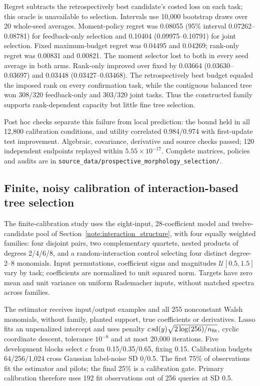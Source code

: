Regret subtracts the retrospectively best candidate's costed loss on each task; this oracle is unavailable to selection. Intervals use 10,000 bootstrap draws over 20 whole-seed averages.
Moment-policy regret was 0.08055 (95\% interval 0.07262--0.08781) for
feedback-only selection and 0.10404 (0.09975--0.10791) for joint selection.
Fixed maximum-budget regret was 0.04495 and 0.04269; rank-only regret was
0.00831 and 0.00821. The moment selector lost to both in every seed average
in both arms. Rank-only improved over fixed by 0.03664 (0.03630--0.03697)
and 0.03448 (0.03427--0.03468). The retrospectively best budget equaled
the imposed rank on every confirmation task, while the contiguous balanced
tree won 308/320 feedback-only and 303/320 joint tasks. Thus the constructed family supports rank-dependent capacity but little fine tree selection.

Post hoc checks separate this failure from local prediction: the bound held in all 12,800 calibration conditions, and utility correlated 0.984/0.974 with first-update test improvement. Algebraic, covariance, derivative and source checks passed; 120 independent endpoints replayed within $5.55\times10^{-17}$. Complete matrices, policies and audits are in \texttt{source\_data/prospective\_morphology\_selection/}.

\subsection{Finite, noisy calibration of interaction-based tree selection}
\label{note:finite_calibration_morphology}

The finite-calibration study uses the eight-input, 28-coefficient model and twelve-candidate pool of Section~\ref{note:interaction_structure}, with four equally weighted families: four disjoint pairs, two complementary quartets, nested products of degrees 2/4/6/8, and a random-interaction control selecting four distinct degree-2--8 monomials. Input permutations, coefficient signs and magnitudes $\mathcal U[0.5,1.5]$ vary by task; coefficients are normalized to unit squared norm. Targets have zero mean and unit variance on uniform Rademacher inputs, without matched spectra across families.

The estimator receives input/output examples and all 255 nonconstant Walsh monomials, without family, planted support, true coefficients or derivatives. Lasso fits an unpenalized intercept and uses penalty $c\operatorname{sd}(y)\sqrt{2\log(256)/n_{\rm fit}}$, cyclic coordinate descent, tolerance $10^{-8}$ and at most 20,000 iterations. Five development blocks select $c$ from 0.15/0.35/0.65, fixing 0.15. Calibration budgets 64/256/1,024 cross Gaussian label-noise SD 0/0.5. The first 75\% of observations fit the estimator and pilots; the final 25\% is a calibration gate. Primary calibration therefore uses 192 fit observations out of 256 queries at SD 0.5.

